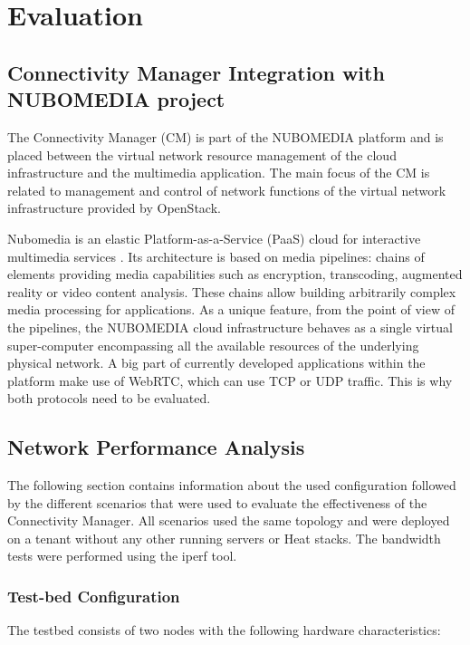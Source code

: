 \chapter{Evaluation}


\section{Connectivity Manager Integration with NUBOMEDIA project}


The Connectivity Manager (CM) is part of the NUBOMEDIA platform and is placed between the virtual network resource management of the cloud infrastructure and the
multimedia application. The main focus of the CM is related to management and control of network functions of the virtual network infrastructure provided by OpenStack.

Nubomedia is an elastic Platform-as-a-Service (PaaS) cloud for interactive multimedia services \cite{nubomedia}. Its architecture is based on media pipelines: chains of elements providing media capabilities such as encryption, transcoding, augmented reality or video content analysis. These chains allow building arbitrarily complex media processing for applications. As a unique feature, from the point of view of the pipelines, the NUBOMEDIA cloud infrastructure behaves as a single virtual super-computer encompassing all the available resources of the underlying physical network. A big part of currently developed applications within the platform make use of WebRTC, which can use TCP or UDP traffic. This is why both protocols need to be evaluated.

\section{Network Performance Analysis}

The following section contains information about the used configuration followed by the different scenarios that were used to evaluate the effectiveness of the Connectivity Manager. All scenarios used the same topology and were deployed on a tenant without any other running servers or Heat stacks. The bandwidth tests were performed using the iperf tool.

\subsection{Test-bed Configuration}

The testbed consists of two nodes with the following hardware characteristics:

